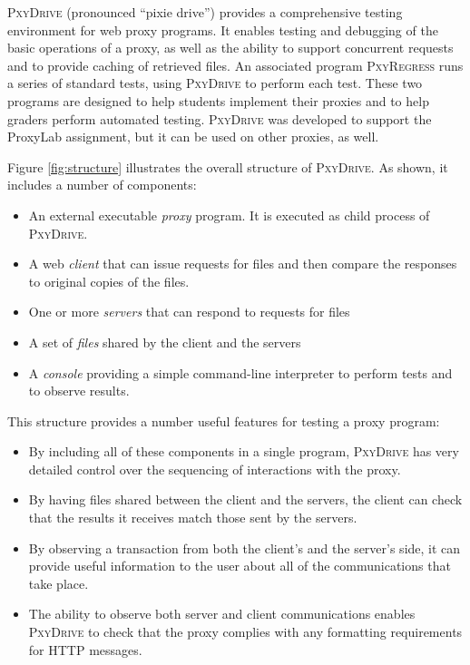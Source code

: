 \documentclass[11pt]{article}
\newcommand{\pxydrive}{\textsc{PxyDrive}}
\newcommand{\pxyregress}{\textsc{PxyRegress}}
\begin{document}
\pxydrive{} (pronounced ``pixie drive'') provides a comprehensive
testing environment for web proxy programs.  It enables testing and
debugging of the basic operations of a proxy, as well as the ability
to support concurrent requests and to provide caching of retrieved
files.  An associated program \pxyregress{} runs a series of standard
tests, using \pxydrive{} to perform each test.  These two programs are
designed to help students implement their proxies and to help graders
perform automated testing.  \pxydrive{} was developed to support the
ProxyLab assignment, but it can be used on other proxies, as well.

\newpage

Figure \ref{fig:structure} illustrates the overall structure of
\pxydrive{}.  As shown, it includes a number of components:
\begin{itemize}
\item An external executable {\em proxy} program.  It is executed as child
  process of \pxydrive.
\item A web {\em client} that can issue requests for files and then compare
  the responses to original copies of the files.
\item One or more {\em servers} that can respond to requests for files
\item A set of {\em files} shared by the client and the servers
\item A {\em console} providing a simple command-line interpreter to
  perform tests and to observe results.
\end{itemize}

This structure provides a number useful features for testing a proxy
program:
\begin{itemize}
\item By including all of these components in a single program, \pxydrive{}
has very detailed control over the sequencing of interactions with the
proxy.
\item By having files shared between the client and the servers, the
  client can check that the results it receives match those sent by
  the servers.
\item By observing a transaction from both the client's and the
  server's side, it can provide useful information to the user about
  all of the communications that take place.
\item The ability to observe both server and client communications
  enables \pxydrive{} to check that the proxy complies with any
  formatting requirements for HTTP messages.
\end{itemize}
\end{document}
